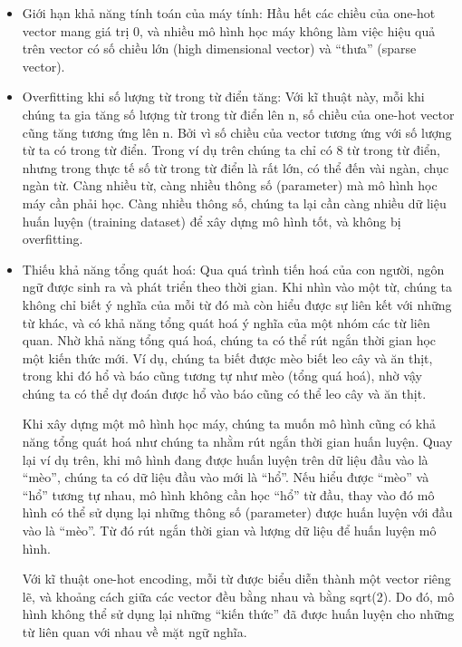 \begin{itemize}
    \item Giới hạn khả năng tính toán của máy tính: Hầu hết các chiều của one-hot vector mang giá trị 0, và nhiều mô hình học máy không làm việc hiệu quả trên vector có số chiều lớn (high dimensional vector) và “thưa” (sparse vector).
    
    \item Overfitting khi số lượng từ trong từ điển tăng: Với kĩ thuật này, mỗi khi chúng ta gia tăng số lượng từ trong từ điển lên n, số chiều của one-hot vector cũng tăng tương ứng lên n. Bởi vì số chiều của vector tương ứng với số lượng từ ta có trong từ điển. Trong ví dụ trên chúng ta chỉ có 8 từ trong từ điển, nhưng trong thực tế số từ trong từ điển là rất lớn, có thể đến vài ngàn, chục ngàn từ. Càng nhiều từ, càng nhiều thông số (parameter) mà mô hình học máy cần phải học. Càng nhiều thông số, chúng ta lại cần càng nhiều dữ liệu huấn luyện (training dataset) để xây dựng mô hình tốt, và không bị overfitting.
    
    \item Thiếu khả năng tổng quát hoá: Qua quá trình tiến hoá của con người, ngôn ngữ được sinh ra và phát triển theo thời gian. Khi nhìn vào một từ, chúng ta không chỉ biết ý nghĩa của mỗi từ đó mà còn hiểu được sự liên kết với những từ khác, và có khả năng tổng quát hoá ý nghĩa của một nhóm các từ liên quan. Nhờ khả năng tổng quá hoá, chúng ta có thể rút ngắn thời gian học một kiến thức mới. Ví dụ, chúng ta biết được mèo biết leo cây và ăn thịt, trong khi đó hổ và báo cũng tương tự như mèo (tổng quá hoá), nhờ vậy chúng ta có thể dự đoán được hổ vào báo cũng có thể leo cây và ăn thịt.
    
    Khi xây dựng một mô hình học máy, chúng ta muốn mô hình cũng có khả năng tổng quát hoá như chúng ta nhằm rút ngắn thời gian huấn luyện. Quay lại ví dụ trên, khi mô hình đang được huấn luyện trên dữ liệu đầu vào là “mèo”, chúng ta có dữ liệu đầu vào mới là “hổ”. Nếu hiểu được “mèo” và “hổ” tương tự nhau, mô hình không cần học “hổ” từ đầu, thay vào đó mô hình có thể sử dụng lại những thông số (parameter) được huấn luyện với đầu vào là “mèo”. Từ đó rút ngắn thời gian và lượng dữ liệu để huấn luyện mô hình. 
    
    Với kĩ thuật one-hot encoding, mỗi từ được biểu diễn thành một vector riêng lẽ, và khoảng cách giữa các vector đều bằng nhau và bằng sqrt(2). Do đó, mô hình không thể sử dụng lại những “kiến thức” đã được huấn luyện cho những từ liên quan với nhau về mặt ngữ nghĩa.

\end{itemize}

